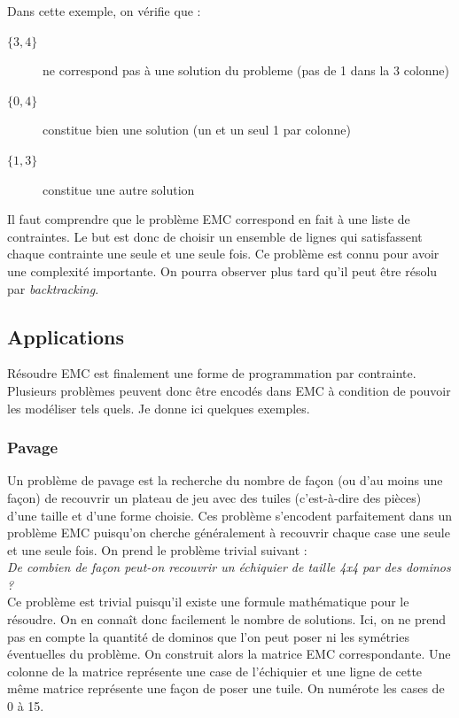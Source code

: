 \documentclass[a4paper]{article}
\begin{document}
Dans cette exemple, on vérifie que :

\begin{description}
\item[$ \{3, 4\} $] ne correspond pas à une solution du probleme (pas de 1 dans la 3 colonne)
\item[$ \{0, 4\} $] constitue bien une solution (un et un seul 1 par colonne)
\item[$ \{1, 3\} $] constitue une autre solution
\end{description}

Il faut comprendre que le problème EMC correspond en fait à une liste de 
contraintes. Le but est donc de choisir un ensemble de lignes qui satisfassent 
chaque contrainte une seule et une seule fois.
Ce problème est connu pour avoir une complexité importante. On pourra observer 
plus tard qu'il peut être résolu par \emph{backtracking}.


\subsection{Applications}

Résoudre EMC est finalement une forme de programmation par contrainte. 
Plusieurs problèmes peuvent donc être encodés dans EMC à 
condition de pouvoir les modéliser tels quels. Je donne ici quelques 
exemples.


\subsubsection{Pavage}
Un problème de pavage est la recherche du nombre de façon 
(ou d'au moins une façon) de recouvrir un
plateau de jeu avec des tuiles (c'est-à-dire des pièces) d'une taille et d'une
forme choisie. Ces problème s'encodent parfaitement dans un problème EMC
puisqu'on cherche généralement à recouvrir chaque case une seule et une 
seule fois. 
On prend le problème trivial suivant : \\


\emph{De combien de façon peut-on recouvrir un échiquier de taille 4x4 par 
des dominos ?}
\\

Ce problème est trivial puisqu'il existe une formule mathématique pour le 
résoudre. On en connaît donc facilement le nombre de solutions. 
Ici, on ne prend 
pas en compte la quantité de dominos que l'on peut poser ni les symétries 
éventuelles du problème. On construit alors la
matrice EMC correspondante. Une colonne de la matrice représente une case de 
l'échiquier et une ligne de cette même matrice représente une façon de poser 
une tuile. On numérote les cases de 0 à 15.
\end{document}
